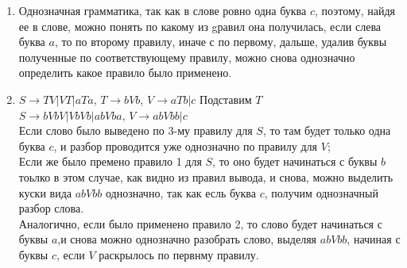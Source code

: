 \documentclass{article}
\begin{document}
\begin{enumerate}
\begin{enumerate}
				\item
					Однозначная грамматика, так как в слове ровно одна буква $c$, поэтому, найдя ее в слове, можно понять по какому из gравил она получилась, если слева буква $a$,  то по второму правилу, иначе с по первому, дальше, удалив буквы полученные по соответствующему правилу, можно снова однозначно определить какое правило было применено.\\
					
				\item
					$S \rightarrow TV|VT|aTa$, $T\rightarrow bVb$, $V \rightarrow aTb|c$
					Подставим $T$\\
					$S \rightarrow bVbV|VbVb|abVba$, $V \rightarrow abVbb|c$\\
					Если слово было выведено по 3-му правилу для $S$, то там будет только одна буква $c$, и разбор проводится уже однозначно по правилу для $V$;\\
					Если же было премено правило 1 для $S$, то оно будет начинаться с буквы $b$ тоьлко в этом случае, как видно из правил вывода, и снова, можно выделить куски вида $abVbb$ однозначно, так как есль буква $c$, получим однозначный разбор слова.\\
					Аналогично, если было применено правило 2, то слово будет начинаться с буквы $a$,и снова можно однозначно разобрать слово, выделяя $abVbb$, начиная с буквы $c$, если $V$ раскрылось по первнму правилу.\\
					
				
			\end{enumerate}
	\end{enumerate}
 
\end{document}
